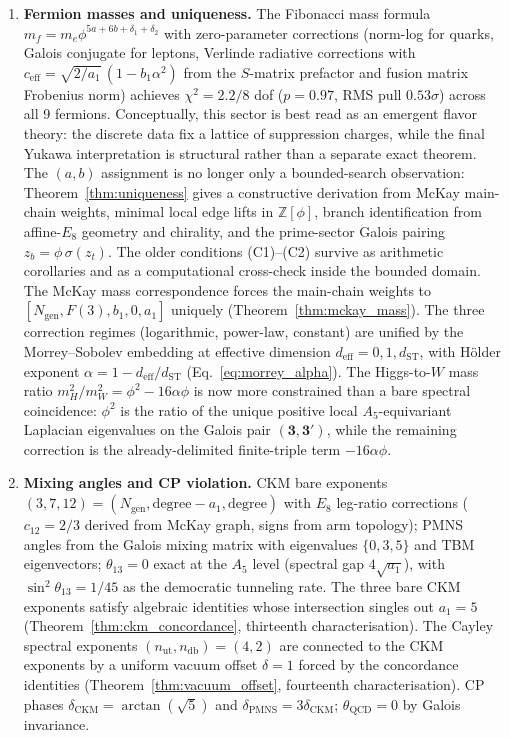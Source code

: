 \documentclass[12pt,a4paper]{article}
\theoremstyle{definition}
\begin{document}
\begin{enumerate}
\item \textbf{Fermion masses and uniqueness.}  The Fibonacci mass formula $m_f = m_e \phi^{5a+6b+\delta_1+\delta_2}$ with zero-parameter corrections (norm-log for quarks, Galois conjugate for leptons, Verlinde radiative corrections with $c_{\mathrm{eff}} = \sqrt{2/a_1}\,(1-b_1\alpha^2)$ from the $S$-matrix prefactor and fusion matrix Frobenius norm) achieves $\chi^2 = 2.2/8$ dof ($p = 0.97$, RMS pull $0.53\sigma$) across all 9 fermions.  Conceptually, this sector is best read as an emergent flavor theory: the discrete data fix a lattice of suppression charges, while the final Yukawa interpretation is structural rather than a separate exact theorem.  The $(a,b)$ assignment is no longer only a bounded-search observation: Theorem~\ref{thm:uniqueness} gives a constructive derivation from McKay main-chain weights, minimal local edge lifts in $\mathbb{Z}[\phi]$, branch identification from affine-$E_8$ geometry and chirality, and the prime-sector Galois pairing $z_b = \phi\,\sigma(z_t)$.  The older conditions (C1)--(C2) survive as arithmetic corollaries and as a computational cross-check inside the bounded domain.  The McKay mass correspondence forces the main-chain weights to $[N_{\text{gen}}, F(3), b_1, 0, a_1]$ uniquely (Theorem~\ref{thm:mckay_mass}).  The three correction regimes (logarithmic, power-law, constant) are unified by the Morrey--Sobolev embedding at effective dimension $d_{\text{eff}} = 0, 1, d_{\text{ST}}$, with H\"{o}lder exponent $\alpha = 1 - d_{\text{eff}}/d_{\text{ST}}$ (Eq.~\ref{eq:morrey_alpha}).  The Higgs-to-$W$ mass ratio $m_H^2/m_W^2 = \phi^2 - 16\alpha\phi$ is now more constrained than a bare spectral coincidence: $\phi^2$ is the ratio of the unique positive local $A_5$-equivariant Laplacian eigenvalues on the Galois pair $(\mathbf{3},\mathbf{3'})$, while the remaining correction is the already-delimited finite-triple term $-16\alpha\phi$.

\item \textbf{Mixing angles and CP violation.}  CKM bare exponents $(3,7,12) = (N_{\text{gen}}, \text{degree}-a_1, \text{degree})$ with $E_8$ leg-ratio corrections ($c_{12} = 2/3$ derived from McKay graph, signs from arm topology); PMNS angles from the Galois mixing matrix with eigenvalues $\{0, 3, 5\}$ and TBM eigenvectors; $\theta_{13} = 0$ exact at the $A_5$ level (spectral gap $4\sqrt{a_1}$), with $\sin^2\theta_{13} = 1/45$ as the democratic tunneling rate.  The three bare CKM exponents satisfy algebraic identities whose intersection singles out $a_1 = 5$ (Theorem~\ref{thm:ckm_concordance}, thirteenth characterisation).  The Cayley spectral exponents $(n_{\text{ut}}, n_{\text{db}}) = (4, 2)$ are connected to the CKM exponents by a uniform vacuum offset $\delta = 1$ forced by the concordance identities (Theorem~\ref{thm:vacuum_offset}, fourteenth characterisation).  CP phases $\delta_{\text{CKM}} = \arctan(\sqrt{5})$ and $\delta_{\text{PMNS}} = 3\delta_{\text{CKM}}$; $\theta_{\text{QCD}} = 0$ by Galois invariance.


\end{enumerate}
\end{document}
